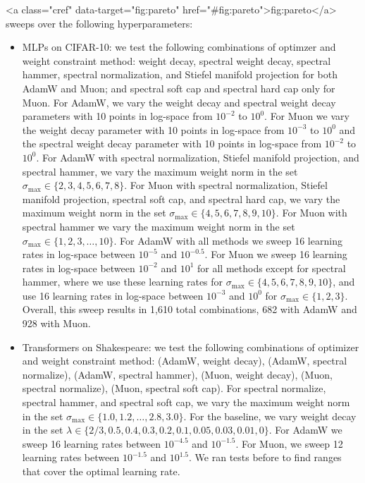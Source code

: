 <a class="cref" data-target="fig:pareto" href="#fig:pareto">fig:pareto</a> sweeps over the following hyperparameters:
\begin{itemize}
    \item MLPs on CIFAR-10: we test the following combinations of optimzer and weight constraint method: weight decay, spectral weight decay, spectral hammer, spectral normalization, and Stiefel manifold projection for both AdamW and Muon; and spectral soft cap and spectral hard cap only for Muon. For AdamW, we vary the weight decay and spectral weight decay parameters with 10 points in log-space from $10^{-2}$ to $10^{0}$. For Muon we vary the weight decay parameter with 10 points in log-space from $10^{-3}$ to $10^{0}$ and the spectral weight decay parameter with 10 points in log-space from $10^{-2}$ to $10^{0}$. For AdamW with spectral normalization, Stiefel manifold projection, and spectral hammer, we vary the maximum weight norm in the set $\sigma_\text{max} \in \{2, 3, 4, 5, 6, 7, 8\}$. For Muon with spectral normalization, Stiefel manifold projection, spectral soft cap, and spectral hard cap, we vary the maximum weight norm in the set $\sigma_\text{max} \in \{4, 5, 6, 7, 8, 9, 10\}$. For Muon with spectral hammer we vary the maximum weight norm in the set $\sigma_\text{max} \in \{1, 2, 3, \ldots , 10\}$. For AdamW with all methods we sweep 16 learning rates in log-space between $10^{-5}$ and $10^{-0.5}$. For Muon we sweep 16 learning rates in log-space between $10^{-2}$ and $10^{1}$ for all methods except for spectral hammer, where we use these learning rates for $\sigma_\text{max} \in \{4, 5, 6, 7, 8, 9, 10\}$, and use 16 learning rates in log-space between $10^{-3}$ and $10^{0}$ for  $\sigma_\text{max} \in \{1, 2, 3\}$. Overall, this sweep results in 1,610 total combinations, 682 with AdamW and 928 with Muon.
    \item Transformers on Shakespeare: we test the following combinations of optimizer and weight constraint method: (AdamW, weight decay), (AdamW, spectral normalize), (AdamW, spectral hammer), (Muon, weight decay), (Muon, spectral normalize), (Muon, spectral soft cap). For spectral normalize, spectral hammer, and spectral soft cap, we vary the maximum weight norm in the set $\sigma_\text{max} \in \{1.0, 1.2, \dots, 2.8, 3.0\}$. For the baseline, we vary weight decay in the set $\lambda \in \{2/3, 0.5, 0.4, 0.3, 0.2, 0.1, 0.05, 0.03, 0.01, 0\}$. For AdamW we sweep 16 learning rates between $10^{-4.5}$ and $10^{-1.5}$. For Muon, we sweep 12 learning rates between $10^{-1.5}$ and $10^{1.5}$. We ran tests before to find ranges that cover the optimal learning rate.
\end{itemize}

